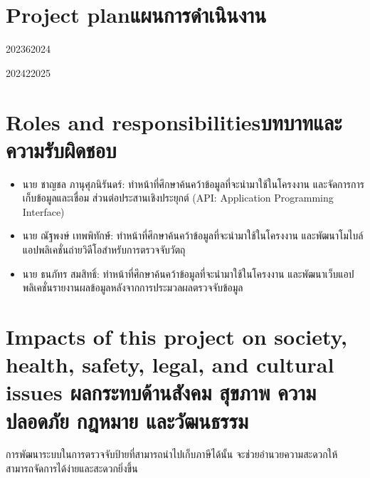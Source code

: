 \section{\ifenglish Project plan\else แผนการดำเนินงาน\fi}

\begin{plan}{10}{2023}{6}{2024}
\end{plan}

\begin{plan}{7}{2024}{2}{2025}
\end{plan}


\section{\ifenglish Roles and responsibilities\else บทบาทและความรับผิดชอบ\fi}
\begin{itemize}
    \item นาย ชาญชล ภานุศุภนิรันดร์: ทำหน้าที่ศึกษาค้นคว้าข้อมูลที่จะนํามาใช้ในโครงงาน และจัดการการเก็บข้อมูลและเชื่อม 
    ส่วนต่อประสานเชิงประยุกต์ (API: Application Programming Interface) 
    \item นาย ณัฐพงษ์ เทพพิทักษ์์: ทําหน้าที่ศึกษาค้นคว้าข้อมูลที่จะนํามาใช้ในโครงงาน และพัฒนาโมไบล์แอปพลิเคชั่นถ่ายวิดีโอสำหรับการตรวจจับวัตถุ 
    \item นาย ธนภัทร สมสิทธิ์: ทําหน้าที่ศึกษาค้นคว้าข้อมูลที่จะนํามาใช้ในโครงงาน และพัฒนาเว็บแอปพลิเคชั่นรายงานผลข้อมูลหลังจากการประมวลผลตรวจจับข้อมูล 
\end{itemize}

\section{\ifenglish%
Impacts of this project on society, health, safety, legal, and cultural issues
\else%
ผลกระทบด้านสังคม สุขภาพ ความปลอดภัย กฎหมาย และวัฒนธรรม
\fi}

การพัฒนาระบบในการตรวจจับป้ายที่สามารถนำไปเก็บภาษีได้นั้น จะช่วยอำนวยความสะดวกให้สามารถจัดการได้ง่ายและสะดวกยิ่งขึ้น
